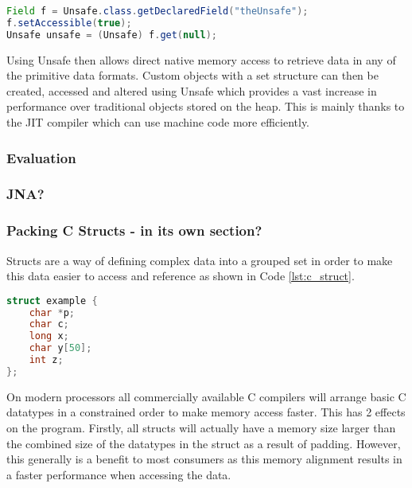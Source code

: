 \documentclass[final_report.tex]{subfiles}
\begin{document}
\begin{lstlisting}[language=Java, caption={Accessing Java Unsafe}, label=lst:java_unsafe]
Field f = Unsafe.class.getDeclaredField("theUnsafe");
f.setAccessible(true);
Unsafe unsafe = (Unsafe) f.get(null);
\end{lstlisting}

Using Unsafe then allows direct native memory access to retrieve data in any of the primitive data formats. Custom objects with a set structure can then be created, accessed and altered using Unsafe which provides a vast increase in performance over traditional objects stored on the heap. This is mainly thanks to the JIT compiler which can use machine code more efficiently.

\subsubsection{Evaluation}

\subsubsection{JNA?}

\subsubsection{Packing C Structs - in its own section?}
Structs are a way of defining complex data into a grouped set in order to make this data easier to access and reference as shown in Code \ref{lst:c_struct}.

\begin{lstlisting}[language=C, caption={Example C Struct}, label=lst:c_struct]
struct example {
    char *p;
    char c;
    long x;
    char y[50];
    int z;
};
\end{lstlisting}

On modern processors all commercially available C compilers will arrange basic C datatypes in a constrained order to make memory access faster. This has 2 effects on the program. Firstly, all structs will actually have a memory size larger than the combined size of the datatypes in the struct as a result of padding. However, this generally is a benefit to most consumers as this memory alignment results in a faster performance when accessing the data.

\end{document}

